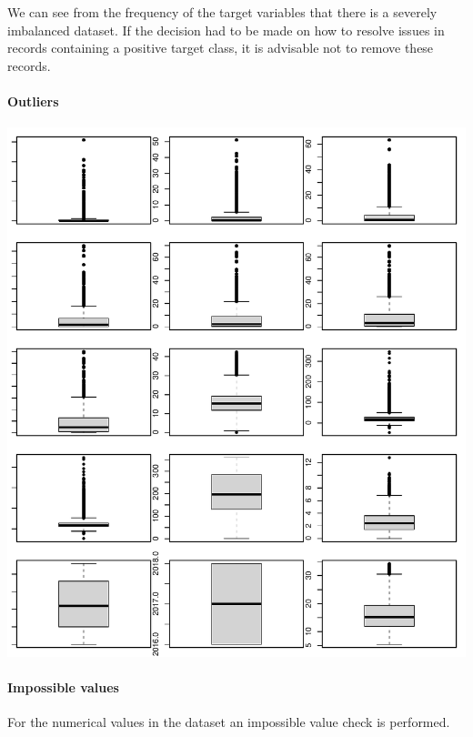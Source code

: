 \documentclass[12pt]{article}
\begin{document}
We can see from the frequency of the target variables that there is a
severely imbalanced dataset. If the decision had to be made on how to
resolve issues in records containing a positive target class, it is
advisable not to remove these records.

\hypertarget{outliers}{%
\paragraph{Outliers}\label{outliers}}

\includegraphics{MATH2269_final_project_files/figure-latex/unnamed-chunk-8-1.pdf}

\hypertarget{impossible-values}{%
\paragraph{Impossible values}\label{impossible-values}}

For the numerical values in the dataset an impossible value check is
performed.
\end{document}
